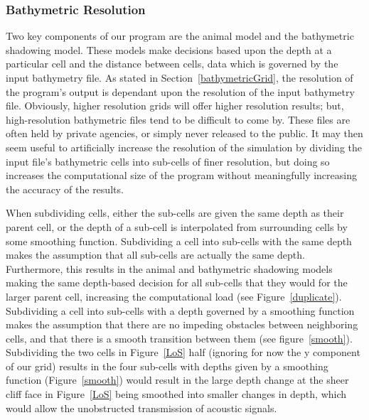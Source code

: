 \subsubsection{Bathymetric Resolution}
Two key components of our program are the animal model and the bathymetric shadowing model.  These models make decisions based upon the depth at a particular cell and the distance between cells, data which is governed by the input bathymetry file.  As stated in Section~\ref{bathymetricGrid}, the resolution of the program's output is dependant upon the resolution of the input bathymetry file.  Obviously, higher resolution grids will offer higher resolution results; but, high-resolution bathymetric files tend to be difficult to come by.  These files are often held by private agencies, or simply never released to the public.  It may then seem useful to artificially increase the resolution of the simulation by dividing the input file's bathymetric cells into sub-cells of finer resolution, but doing so increases the computational size of the program without meaningfully increasing the accuracy of the results.    
 
 
When subdividing cells, either the sub-cells are given the same depth as their parent cell, or the depth of a sub-cell is interpolated from surrounding cells by some smoothing function.  Subdividing a cell into sub-cells with the same depth makes the assumption that all sub-cells are actually the same depth.  Furthermore, this results in the animal and bathymetric shadowing models making the same depth-based decision for all sub-cells that they would for the larger parent cell, increasing the computational load (see Figure~\ref{duplicate}).  Subdividing a cell into sub-cells with a depth governed by a smoothing function makes the assumption that there are no impeding obstacles between neighboring cells, and that there is a smooth transition between them (see figure~\ref{smooth}).  Subdividing the two cells in Figure~\ref{LoS} half (ignoring for now the y component of our grid) results in the four sub-cells with depths given by a smoothing function (Figure~\ref{smooth}) would result in the large depth change at the sheer cliff face in Figure~\ref{LoS} being smoothed into smaller changes in depth, which would allow the unobstructed transmission of acoustic signals.


